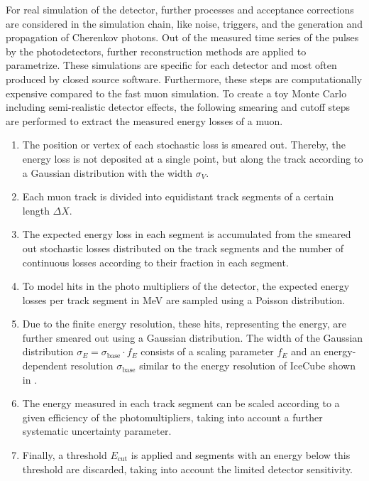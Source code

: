 
For real simulation of the detector, further processes and acceptance corrections are considered in the simulation chain, like noise, triggers, and the generation and propagation of Cherenkov photons.
Out of the measured time series of the pulses by the photodetectors, further reconstruction methods are applied to parametrize.
These simulations are specific for each detector and most often produced by closed source software.
Furthermore, these steps are computationally expensive compared to the fast muon simulation.
To create a toy Monte Carlo including semi-realistic detector effects, the following smearing and cutoff steps are performed to extract the measured energy losses of a muon.
\begin{enumerate}
    \item The position or vertex of each stochastic loss is smeared out. Thereby, the energy loss is not deposited at a single point, but along the track according to a Gaussian distribution with the width $\sigma_V$.
    \item Each muon track is divided into equidistant track segments of a certain length $\Delta X$.
    \item The expected energy loss in each segment is accumulated from the smeared out stochastic losses distributed on the track segments and the number of continuous losses according to their fraction in each segment.
    \item To model hits in the photo multipliers of the detector, the expected energy losses per track segment in MeV are sampled using a Poisson distribution.
    \item Due to the finite energy resolution, these hits, representing the energy, are further smeared out using a Gaussian distribution. The width of the Gaussian distribution $\sigma_E = \sigma_{\text{base}} \cdot f_E$ consists of a scaling parameter $f_E$ and an energy-dependent resolution $\sigma_{\text{base}}$ similar to the energy resolution of IceCube \cite{IceCube2014Ereco} shown in .
    \item The energy measured in each track segment can be scaled according to a given efficiency of the photomultipliers, taking into account a further systematic uncertainty parameter.
    \item Finally, a threshold $E_{\text{cut}}$ is applied and segments with an energy below this threshold are discarded, taking into account the limited detector sensitivity.
\end{enumerate}
